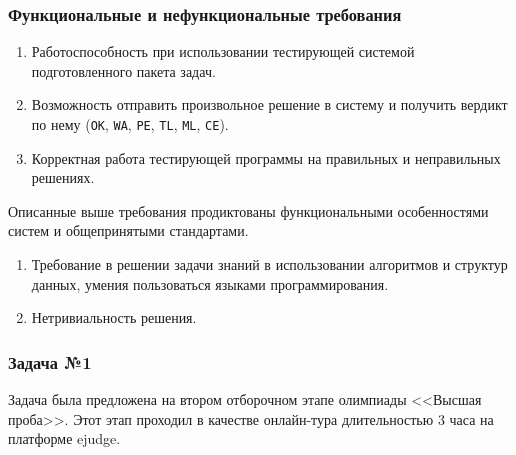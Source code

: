 \documentclass{beamer}
\newcounter{nameOfYourChoice}
\begin{document}
\begin{frame}
\frametitle{Функциональные и нефункциональные требования}
\begin{enumerate}
\item Работоспособность при использовании тестирующей системой подготовленного пакета задач.
\item Возможность отправить произвольное решение в систему и получить вердикт по нему (\texttt{OK}, \texttt{WA}, \texttt{PE}, \texttt{TL}, \texttt{ML}, \texttt{CE}).
\item Корректная работа тестирующей программы на правильных и неправильных решениях.
\setcounter{nameOfYourChoice}{\value{enumi}}
\end{enumerate}
Описанные выше требования продиктованы функциональными особенностями систем и общепринятыми стандартами.
\begin{enumerate}
    \setcounter{enumi}{\value{nameOfYourChoice}}
    \item Требование в решении задачи знаний в использовании алгоритмов и структур данных, умения пользоваться языками программирования.
    \item Нетривиальность решения.
\end{enumerate}
\end{frame}








\begin{frame}
\frametitle{Задача №1}
    Задача была предложена на втором отборочном этапе олимпиады <<Высшая проба>>. Этот этап проходил в качестве онлайн-тура длительностью 3 часа на платформе ejudge. 
\end{frame}
\end{document}
